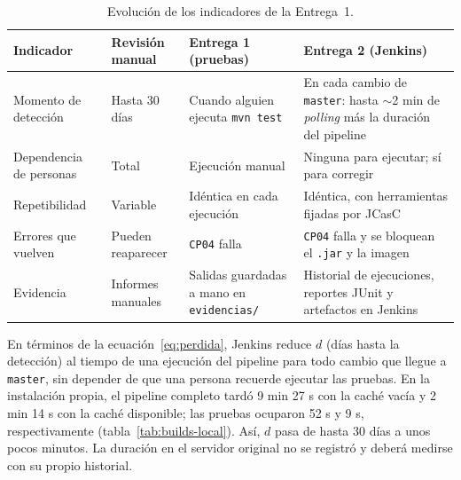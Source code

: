 \documentclass[11pt,a4paper]{article}
\begin{document}
\begin{table}[H]
\centering
\small
\begin{tabularx}{\textwidth}{@{}P{2.6cm} L L L@{}}
\toprule
\textbf{Indicador} & \textbf{Revisión manual} & \textbf{Entrega 1 (pruebas)} & \textbf{Entrega 2 (Jenkins)}\\
\midrule
Momento de detección & Hasta 30 días & Cuando alguien ejecuta \texttt{mvn test} & En cada cambio de
\texttt{master}: hasta $\sim$2 min de \emph{polling} más la duración del pipeline\\
Dependencia de personas & Total & Ejecución manual & Ninguna para ejecutar; sí para corregir\\
Repetibilidad & Variable & Idéntica en cada ejecución & Idéntica, con herramientas fijadas por JCasC\\
Errores que vuelven & Pueden reaparecer & \texttt{CP04} falla & \texttt{CP04} falla y se bloquean
el \texttt{.jar} y la imagen\\
Evidencia & Informes manuales & Salidas guardadas a mano en \texttt{evidencias/} & Historial de
ejecuciones, reportes JUnit y artefactos en Jenkins\\
\bottomrule
\end{tabularx}
\caption{Evolución de los indicadores de la Entrega~1.}
\label{tab:indicadores}
\end{table}

En términos de la ecuación~\eqref{eq:perdida}, Jenkins reduce $d$ (días hasta la detección) al tiempo
de una ejecución del pipeline para todo cambio que llegue a \texttt{master}, sin depender de que una
persona recuerde ejecutar las pruebas. En la instalación propia, el pipeline completo tardó 9 min
27 s con la caché vacía y 2 min 14 s con la caché disponible; las pruebas ocuparon 52 s y 9 s,
respectivamente (tabla~\ref{tab:builds-local}). Así, $d$ pasa de hasta 30 días a unos pocos minutos.
La duración en el servidor original no se registró y deberá medirse con su propio historial.
\end{document}
